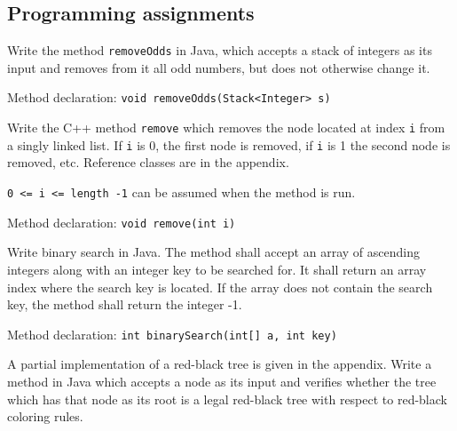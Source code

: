 \documentclass[addpoints]{exam}
\begin{document}
\begin{questions}




	\newpage

	\section{Programming assignments}

	\question[10]

	Write the method \texttt{removeOdds} in Java, which accepts a stack of integers as its input and removes from it all odd numbers, but does not otherwise change it.

	Method declaration: \texttt{void removeOdds(Stack<Integer> s)}


	\newpage

	\question[10]

	Write the C++ method \texttt{remove} which removes the node located at index \texttt{i} from a singly linked list. If \texttt{i} is 0, the first node is removed, if \texttt{i} is 1 the second node is removed, etc. Reference classes are in the appendix. 

	\texttt{0 <= i <= length -1} can be assumed when the method is run.

	Method declaration: \texttt{void remove(int i)}


	\newpage

	\question[10]

	Write binary search in Java. The method shall accept an array of ascending integers along with an integer key to be searched for. It shall return an array index where the search key is located. If the array does not contain the search key, the method shall return the integer -1.

	Method declaration: \texttt{int binarySearch(int[] a, int key)}


	\newpage

	\question[10]

	A partial implementation of a red-black tree is given in the appendix. Write a method in Java which accepts a node as its input and verifies whether the tree which has that node as its root is a legal red-black tree with respect to red-black coloring rules.


\end{questions}
\end{document}
